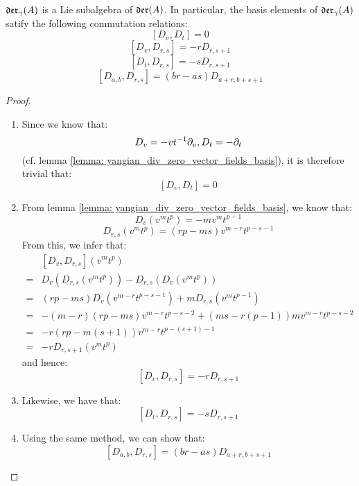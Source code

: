         \begin{lemma} \label{lemma: commutators_of_yangian_div_zero_vector_fields}
            $\mathfrak{der}_{\gamma}(A)$ is a Lie subalgebra of $\mathfrak{der}(A)$. In particular, the basis elements of $\mathfrak{der}_{\gamma}(A)$ satify the following commutation relations:
                $$[D_v, D_t] = 0$$
                $$[D_v, D_{r, s}] = -r D_{r, s + 1}$$
                $$[D_t, D_{r, s}] = -s D_{r, s + 1}$$
                $$[D_{a, b}, D_{r, s}] = (br - as) D_{a + r, b + s + 1}$$
        \end{lemma}
            \begin{proof}
                \begin{enumerate}
                    \item Since we know that:
                        $$D_v = -vt^{-1} \partial_v, D_t = -\partial_t$$
                    (cf. lemma \ref{lemma: yangian_div_zero_vector_fields_basis}), it is therefore trivial that:
                        $$[D_v, D_t] = 0$$
                    \item From lemma \ref{lemma: yangian_div_zero_vector_fields_basis}, we know that:
                        $$D_v(v^m t^p) = -m v^m t^{p - 1}$$
                        $$D_{r, s}(v^m t^p) = ( rp - ms ) v^{m - r} t^{p - s - 1}$$
                    From this, we infer that:
                        $$
                            \begin{aligned}
                                & [D_v, D_{r, s}](v^m t^p)
                                \\
                                = & D_v( D_{r, s}(v^m t^p) ) - D_{r, s}( D_v(v^m t^p) )
                                \\
                                = & (rp - ms) D_v( v^{m - r} t^{p - s - 1} ) + m D_{r, s}( v^m t^{p - 1} )
                                \\
                                = & -(m - r)(rp - ms) v^{m - r} t^{p - s - 2} + (ms - r(p - 1)) m v^{m - r} t^{p - s - 2}
                                \\
                                = & -r(rp - m(s + 1)) v^{m - r} t^{p - (s + 1) - 1}
                                \\
                                = & -r D_{r, s + 1}(v^m t^p)
                            \end{aligned}
                        $$
                    and hence:
                        $$[D_v, D_{r, s}] = -r D_{r, s + 1}$$
                    \item Likewise, we have that:
                        $$[D_t, D_{r, s}] = -s D_{r, s + 1}$$
                    \item Using the same method, we can show that:
                        $$[D_{a, b}, D_{r, s}] = (br - as) D_{a + r, b + s + 1}$$
                \end{enumerate}
            \end{proof}

